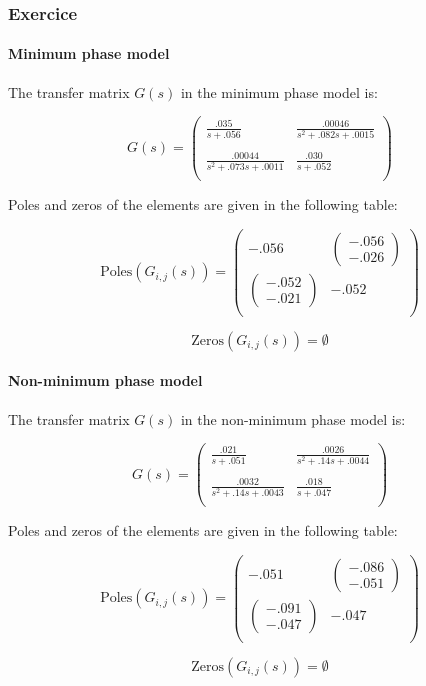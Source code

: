 \subsubsection{Exercice}
\paragraph{Minimum phase model}

The transfer matrix $G(s)$ in the minimum phase model is:

$$G(s) = \left(\begin{array}{cc} 
    \frac{.035}{s + .056} & \frac{.00046}{s^2 + .082 s + .0015} \\
    \\
    \frac{ .00044}{  s^2 + .073 s + .0011} & \frac{.030}{s + .052} \\
\end{array}\right)$$


Poles and zeros of the elements are given in the following table:

$$
\text{Poles}(G_{i,j}(s)) = \left(\begin{array}{cc} -.056 & \left(\begin{array}{c} -.056\\ -.026 \end{array}\right) \\ \left(\begin{array}{c} -.052\\ -.021 \end{array}\right) & -.052 \\ \end{array}\right)
$$

$$\text{Zeros}(G_{i,j}(s)) = \emptyset $$

\paragraph{Non-minimum phase model}

The transfer matrix $G(s)$ in the non-minimum phase model is:

$$G(s) = \left(\begin{array}{cc} 
    \frac{.021}{s + .051} & \frac{.0026}{s^2 + .14 s + .0044} \\
    \\
    \frac{ .0032}{ s^2 + .14 s + .0043} & \frac{.018}{s + .047} \\
\end{array}\right)$$

Poles and zeros of the elements are given in the following table:


$$\text{Poles}(G_{i,j}(s)) = 
\left(\begin{array}{cc} -.051 & \left(\begin{array}{c} -.086\\ -.051 \end{array}\right) \\ \left(\begin{array}{c} -.091\\ -.047 \end{array}\right) & -.047 \\ \end{array}\right)
$$

$$\text{Zeros}(G_{i,j}(s)) = \emptyset $$
